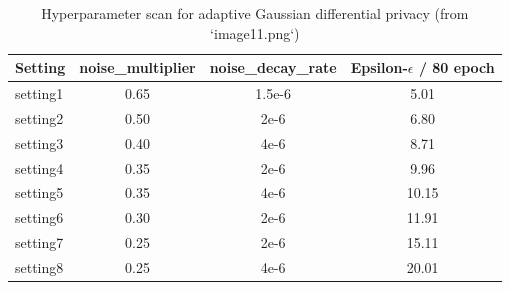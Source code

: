 \documentclass[a4paper,11pt]{article}
\begin{document}
\begin{table}[htbp]
\centering
\caption{Generalization performance on different test sets (from `image10.png`)}
\end{table}

\begin{table}[htbp]
\centering
\caption{Hyperparameter scan for adaptive Gaussian differential privacy (from `image11.png`)}
\begin{tabular}{lccc}
\toprule
Setting & noise\_multiplier & noise\_decay\_rate & Epsilon-$\epsilon$ / 80 epoch \\
\midrule
setting1 & 0.65 & 1.5e-6 & 5.01 \\
setting2 & 0.50 & 2e-6 & 6.80 \\
setting3 & 0.40 & 4e-6 & 8.71 \\
setting4 & 0.35 & 2e-6 & 9.96 \\
setting5 & 0.35 & 4e-6 & 10.15 \\
setting6 & 0.30 & 2e-6 & 11.91 \\
setting7 & 0.25 & 2e-6 & 15.11 \\
setting8 & 0.25 & 4e-6 & 20.01 \\
\bottomrule
\end{tabular}
\end{table}
\end{document}
